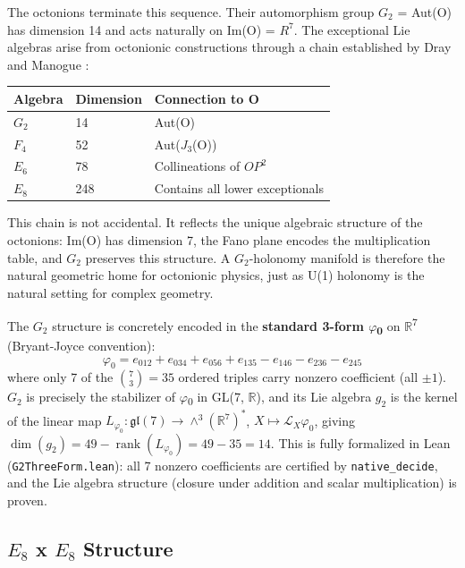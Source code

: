 \documentclass[11pt,a4paper]{article}
\begin{document}
The octonions terminate this sequence. Their automorphism group
\(G_{2}\) = Aut(O) has dimension 14 and acts naturally on Im(O) =
\(R^7\). The exceptional Lie algebras arise from octonionic
constructions through a chain established by Dray and Manogue \cite{17}:

\begin{longtable}[]{@{}lll@{}}
\toprule\noalign{}
Algebra & Dimension & Connection to O \\
\midrule\noalign{}
\endhead
\bottomrule\noalign{}
\endlastfoot
\(G_{2}\) & 14 & Aut(O) \\
\(F_{4}\) & 52 & Aut(\(J_{3}\)(O)) \\
\(E_{6}\) & 78 & Collineations of \(OP^{2}\) \\
\(E_{8}\) & 248 & Contains all lower exceptionals \\
\end{longtable}


This chain is not accidental. It reflects the unique algebraic structure
of the octonions: Im(O) has dimension 7, the Fano plane encodes the
multiplication table, and \(G_{2}\) preserves this structure. A
\(G_{2}\)-holonomy manifold is therefore the natural geometric home for
octonionic physics, just as U(1) holonomy is the natural setting for
complex geometry.

The \(G_{2}\) structure is concretely encoded in the \textbf{standard
3-form \(\varphi\)\textsubscript{0}} on
\(\mathbb{R}\)\textsuperscript{7} (Bryant-Joyce convention):
\[\varphi_0 = e_{012} + e_{034} + e_{056} + e_{135} - e_{146} - e_{236} - e_{245}\]
where only 7 of the \(\binom{7}{3} = 35\) ordered triples carry nonzero
coefficient (all \(\pm 1\)). \(G_{2}\) is precisely the stabilizer of
\(\varphi\)\textsubscript{0} in GL(7, \(\mathbb{R}\)), and its Lie
algebra \(g_{2}\) is the kernel of the linear map
\(L_{\varphi_0} : \mathfrak{gl}(7) \to \wedge^3(\mathbb{R}^7)^*\),
\(X \mapsto \mathcal{L}_X \varphi_0\), giving
\(\dim(g_2) = 49 - \operatorname{rank}(L_{\varphi_0}) = 49 - 35 = 14\).
This is fully formalized in Lean (\texttt{G2ThreeForm.lean}): all 7
nonzero coefficients are certified by \texttt{native\_decide}, and the
Lie algebra structure (closure under addition and scalar multiplication)
is proven.

\subsection{\texorpdfstring{\(E_{8}\) x \(E_{8}\)
Structure}{E\_\{8\} x E\_\{8\} Structure}}\label{e_8-x-e_8-structure}
\end{document}
